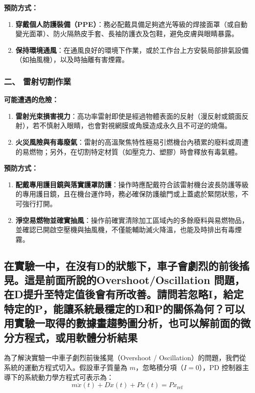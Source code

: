 \documentclass[12pt]{article}
\begin{document}
\textbf{預防方式：}
\begin{enumerate}
    \item \textbf{穿戴個人防護裝備（PPE）}：務必配戴具備足夠遮光等級的焊接面罩（或自動變光面罩）、防火隔熱皮手套、長袖防護衣及包鞋，避免皮膚與眼睛暴露。
    \item \textbf{保持環境通風}：在通風良好的環境下作業，或於工作台上方安裝局部排氣設備（如抽風機），以及時抽離有害煙霧。
\end{enumerate}

\vspace{1em} %

\subsubsection*{二、 雷射切割作業}
\textbf{可能遭遇的危險：}
\begin{enumerate}
    \item \textbf{雷射光束損害視力}：高功率雷射即使是經過物體表面的反射（漫反射或鏡面反射），若不慎射入眼睛，也會對視網膜或角膜造成永久且不可逆的燒傷。
    \item \textbf{火災風險與有毒廢氣}：雷射的高溫聚焦特性極易引燃機台內積累的廢料或周遭的易燃物；另外，在切割特定材質（如壓克力、塑膠）時會釋放有毒氣體。
\end{enumerate}

\textbf{預防方式：}
\begin{enumerate}
    \item \textbf{配戴專用護目鏡與落實護罩防護}：操作時應配戴符合該雷射機台波長防護等級的專用護目鏡，且在機台運作時，務必確保防護艙門或上蓋處於緊閉狀態，不可強行打開。
    \item \textbf{淨空易燃物並確實抽風}：操作前確實清除加工區域內的多餘廢料與易燃物品，並確認已開啟空壓機與抽風機，不僅能輔助滅火降溫，也能及時排出有毒煙霧。
\end{enumerate}

\subsection{在實驗⼀中，在沒有D的狀態下，⾞⼦會劇烈的前後搖晃。這是前⾯所說的Overshoot/Oscillation 問題，在D提升⾄特定值後會有所改善。請問若忽略I，給定特定的P，能讓系統最穩定的D和P的關係為何？可以⽤實驗⼀取得的數據畫趨勢圖分析，也可以解前⾯的微分⽅程式，或⽤軟體分析結果}

為了解決實驗一中車子劇烈前後搖晃（Overshoot / Oscillation）的問題，我們從系統的運動方程式切入。假設車子質量為 $m$，忽略積分項（$I=0$），PD 控制器主導下的系統動力學方程式可表示為：
$$m\ddot{x}(t) + D\dot{x}(t) + Px(t) = P x_{\text{ref}}$$
\end{document}
